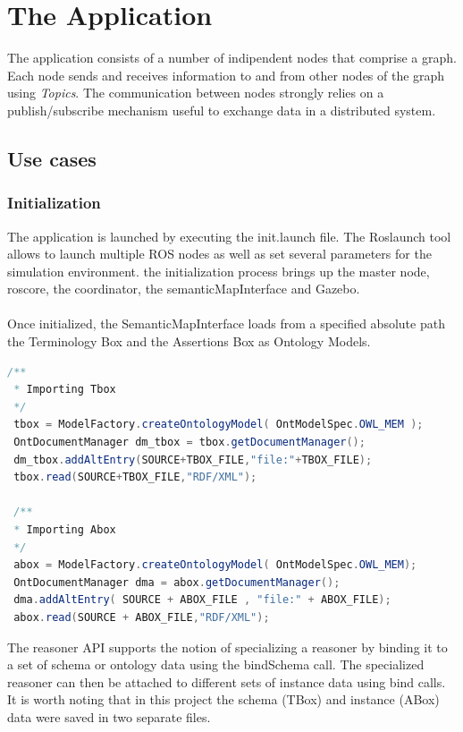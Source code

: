 \section{The Application}

The application consists of a number of indipendent nodes that comprise a graph. Each node sends and receives information to and from other nodes of the graph using \textit{Topics}.
The communication between nodes strongly relies on a publish/subscribe mechanism useful to  exchange data in a distributed system. 


\subsection{Use cases}

\subsubsection{Initialization}
The application is launched by executing the init.launch file. The Roslaunch tool allows to launch multiple ROS nodes as well as set several parameters for the simulation environment. the initialization process brings up the master node, roscore, the coordinator, the semanticMapInterface and Gazebo.\\
\\
Once initialized, the SemanticMapInterface loads from a specified absolute path the Terminology Box and the Assertions Box as Ontology Models.

\begin{lstlisting}[language=Java]
/**
 * Importing Tbox
 */
 tbox = ModelFactory.createOntologyModel( OntModelSpec.OWL_MEM );
 OntDocumentManager dm_tbox = tbox.getDocumentManager();
 dm_tbox.addAltEntry(SOURCE+TBOX_FILE,"file:"+TBOX_FILE);
 tbox.read(SOURCE+TBOX_FILE,"RDF/XML");

 /**
 * Importing Abox
 */
 abox = ModelFactory.createOntologyModel( OntModelSpec.OWL_MEM);
 OntDocumentManager dma = abox.getDocumentManager();
 dma.addAltEntry( SOURCE + ABOX_FILE , "file:" + ABOX_FILE);
 abox.read(SOURCE + ABOX_FILE,"RDF/XML");
\end{lstlisting}

The reasoner API supports the notion of specializing a reasoner by binding it to a set of schema or ontology data using the bindSchema call. The specialized reasoner can then be attached to different sets of instance data using bind calls. It is worth noting that in this project the schema (TBox) and instance (ABox) data were saved in two separate files.


